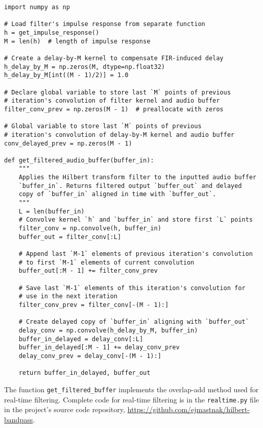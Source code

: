 \begin{listing}
\begin{verbatim}
import numpy as np

# Load filter's impulse response from separate function
h = get_impulse_response()
M = len(h)  # length of impulse response

# Create a delay-by-M kernel to compensate FIR-induced delay 
h_delay_by_M = np.zeros(M, dtype=np.float32)
h_delay_by_M[int((M - 1)/2)] = 1.0

# Declare global variable to store last `M` points of previous
# iteration's convolution of filter kernel and audio buffer
filter_conv_prev = np.zeros(M - 1)  # preallocate with zeros

# Global variable to store last `M` points of previous
# iteration's convolution of delay-by-M kernel and audio buffer
conv_delayed_prev = np.zeros(M - 1)

def get_filtered_audio_buffer(buffer_in):
    """
    Applies the Hilbert transform filter to the inputted audio buffer
    `buffer_in`. Returns filtered output `buffer_out` and delayed
    copy of `buffer_in` aligned in time with `buffer_out`.
    """
    L = len(buffer_in)
    # Convolve kernel `h` and `buffer_in` and store first `L` points
    filter_conv = np.convolve(h, buffer_in)
    buffer_out = filter_conv[:L]

    # Append last `M-1` elements of previous iteration's convolution
    # to first `M-1` elements of current convolution
    buffer_out[:M - 1] += filter_conv_prev

    # Save last `M-1` elements of this iteration's convolution for
    # use in the next iteration
    filter_conv_prev = filter_conv[-(M - 1):]

    # Create delayed copy of `buffer_in` aligning with `buffer_out`
    delay_conv = np.convolve(h_delay_by_M, buffer_in)
    buffer_in_delayed = delay_conv[:L]
    buffer_in_delayed[:M - 1] += delay_conv_prev
    delay_conv_prev = delay_conv[-(M - 1):]

    return buffer_in_delayed, buffer_out
\end{verbatim}
    \vspace{-1ex}
    \caption{The function \texttt{get\_filtered\_buffer} implements the overlap-add method used for real-time filtering.
    Complete code for real-time filtering is in the \texttt{realtime.py} file in the project's source code repository, \url{https://github.com/ejmastnak/hilbert-bandpass}.}
    \label{code:filter}
\end{listing}

